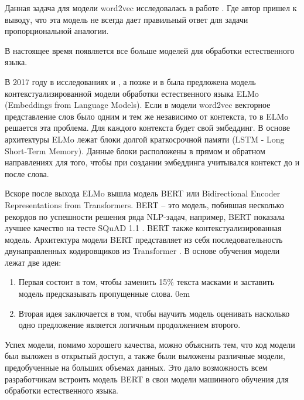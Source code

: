 \documentclass[a4paper,14pt]{article}
\begin{document}
Данная задача для модели word2vec исследовалась в работе \cite{w2vkor}. Где автор пришел к выводу, что эта модель не всегда дает правильный ответ для задачи пропорциональной аналогии.

В настоящее время появляется все больше моделей для обработки естественного языка.

В 2017 году в исследованиях \cite{elmo1} и \cite{elmo2}, а позже и в \cite{elmo3} была предложена модель контекстуализированной модели обработки естественного языка ELMo (Embeddings from Language Models).
Если в модели word2vec векторное представление слов было одним и тем же независимо от контекста, то в ELMo решается эта проблема.
Для каждого контекста будет свой эмбеддинг.
В основе архитектуры ELMo лежат блоки долгой краткосрочной памяти (LSTM - Long Short-Term Memory).
Данные блоки расположены в прямом и обратном направлениях для того, чтобы при создании эмбеддинга учитывался контекст до и после слова.

Вскоре после выхода ELMo вышла модель BERT \cite{bert1} или Bidirectional Encoder Representations from Transformers.
BERT – это модель, побившая несколько рекордов по успешности решения ряда NLP-задач, например, BERT показала лучшее качество на тесте SQuAD 1.1 \cite{squad}.
BERT также контекстуализированная модель.
Архитектура модели BERT представляет из себя последовательность двунаправленных кодировщиков из Transformer \cite{attention}.
В основе обучения модели лежат две идеи:

\begin{enumerate}
	\itemsep0em 
	\item Первая состоит в том, чтобы заменить 15\% текста масками и заставить модель предсказывать пропущенные слова.
	\itemsep0em 
	\item Вторая идея заключается в том, чтобы научить модель оценивать насколько одно предложение является логичным продолжением второго.
\end{enumerate}

Успех модели, помимо хорошего качества, можно объяснить тем, что код модели был выложен в открытый доступ, а также были выложены различные модели, предобученные на больших объемах данных.
Это дало возможность всем разработчикам встроить модель BERT в свои модели машинного обучения для обработки естественного языка.
\end{document}
